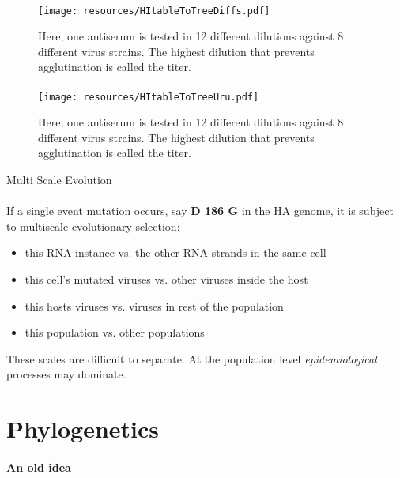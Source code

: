 \documentclass{beamer}
\begin{document}
\begin{darkframes}
    \begin{frame}{\subsecname}
      \framesubtitle{}
      \begin{figure}
        \texttt{[image: resources/HItableToTreeDiffs.pdf]}
        \caption{\footnotesize Here, one antiserum is tested in 12 different dilutions against 8 different virus strains. The highest dilution that prevents agglutination is called the titer.}
      \end{figure}
    \end{frame}

    \begin{frame}{\subsecname}
      \framesubtitle{}
      \begin{figure}
        \texttt{[image: resources/HItableToTreeUru.pdf]}
        \caption{\footnotesize Here, one antiserum is tested in 12 different dilutions against 8 different virus strains. The highest dilution that prevents agglutination is called the titer.}
      \end{figure}
    \end{frame}

    \begin{frame}{Multi Scale Evolution}
      \framesubtitle{}
      If a single event mutation occurs, say \textbf{D 186 G} in the HA genome, it is subject to multiscale evolutionary selection:
      \begin{itemize}
        \item this RNA instance vs. the other RNA strands in the same cell
        \item this cell's mutated viruses vs. other viruses inside the host
        \item this hosts viruses vs. viruses in rest of the population
        \item this population vs. other populations
      \end{itemize}
      These scales are difficult to separate. At the population level \textit{epidemiological} processes may dominate.
    \end{frame}



  \section{Phylogenetics}

    \begin{frame}{\secname}
      \framesubtitle{An old idea}
    \end{frame}


\end{darkframes}
\end{document}
